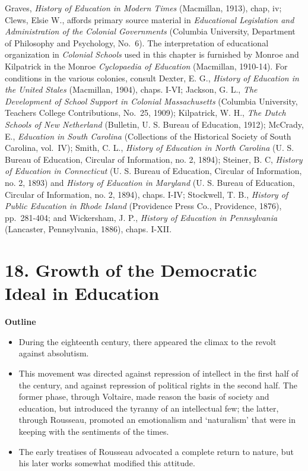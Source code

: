 \documentclass[]{book}
\providecommand{\tightlist}{%
  \setlength{\itemsep}{0pt}\setlength{\parskip}{0pt}}
\begin{document}
Graves, \emph{History of Education in Modern Times} (Macmillan, 1913), chap, iv; Clews, Elsie W., affords primary source material in \emph{Educational Legislation and Administration of the Colonial Governments} (Columbia University, Department of Philosophy and Psychology, No.~6). The interpretation of educational organization in \emph{Colonial Schools} used in this chapter is furnished by Monroe and Kilpatrick in the Monroe \emph{Cyclopaedia of Education} (Macmillan, 1910-14). For conditions in the various colonies, consult Dexter, E. G., \emph{History of Education in the United Stales} (Macmillan, 1904), chaps. I-VI; Jackson, G. L., \emph{The Development of School Support in Colonial Massachusetts} (Columbia University, Teachers College Contributions, No.~25, 1909); Kilpatrick, W. H., \emph{The Dutch Schools of New Netherland} (Bulletin, U. S. Bureau of Education, 1912); McCrady, E., \emph{Education in South Carolina} (Collections of the Historical Society of South Carolina, vol.~IV); Smith,\protect\hypertarget{ch17.xmlux5cux23para.257.1.0.box.257.234.1051.404.q.50}{}{ C. L., \emph{History of Education in North Carolina} (U. S. Bureau of Education, Circular of Information, no. 2, 1894); Steiner, B. C, \emph{History of Education in Connecticut} (U. S. Bureau of Education, Circular of Information, no. 2, 1893) and \emph{History of Education in Maryland} (U. S. Bureau of Education, Circular of Information, no. 2, 1894), chaps. I-IV; Stockwell, T. B., \emph{History of Public Education in Rhode Island} (Providence Press Co., Providence, 1876), pp.~281-404; and Wickersham, J. P., \emph{History of Education in Pennsylvania} (Lancaster, Pennsylvania, 1886), chaps. I-XII.}

\hypertarget{growth-of-the-democratic-ideal-in-education}{%
\chapter{18. Growth of the Democratic Ideal in Education}\label{growth-of-the-democratic-ideal-in-education}}

\textbf{Outline}

\begin{itemize}
\tightlist
\item
  During the eighteenth century, there appeared the climax to the revolt against absolutism.
\item
  This movement was directed against repression of intellect in the first half of the century, and against repression of political rights in the second half. The former phase, through Voltaire, made reason the basis of society and education, but introduced the tyranny of an intellectual few; the latter, through Rousseau, promoted an emotionalism and `naturalism' that were in keeping with the sentiments of the times.
\item
  The early treatises of Rousseau advocated a complete return to nature, but his later works somewhat modified this attitude.
\end{itemize}
\end{document}
